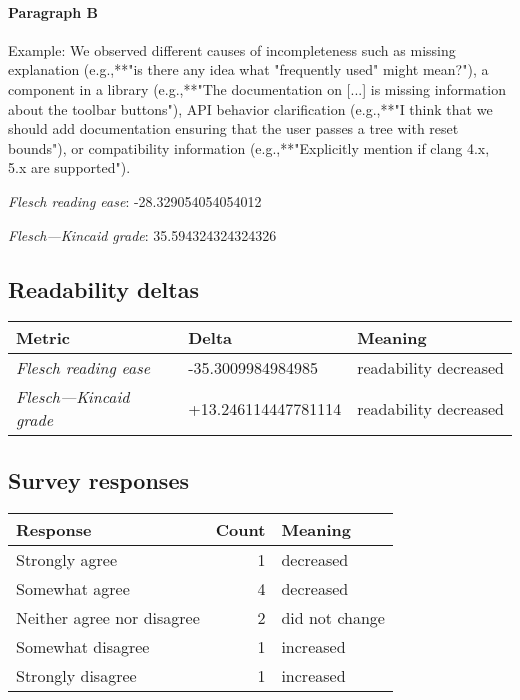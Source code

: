 \paragraph{Paragraph B}
Example: We observed different causes of incompleteness such as missing explanation (e.g.,**"is there any idea what "frequently used" might mean?"), a component in a library (e.g.,**"The documentation on [...] is missing information about the toolbar buttons"), API behavior clarification (e.g.,**"I think that we should add documentation ensuring that the user passes a tree with reset bounds"), or compatibility information (e.g.,**"Explicitly mention if clang 4.x, 5.x are supported").\par\medskip\emph{Flesch reading ease}: -28.329054054054012\par\emph{Flesch---Kincaid grade}: 35.594324324324326

\subsection{Readability deltas}

\begin{tabular}{lll}
\toprule
               \textbf{Metric} &       \textbf{Delta} &       \textbf{Meaning} \\
\midrule
    \emph{Flesch reading ease} &    -35.3009984984985 &  readability decreased \\
 \emph{Flesch---Kincaid grade} &  +13.246114447781114 &  readability decreased \\
\bottomrule
\end{tabular}

\subsection{Survey responses}
\begin{tabular}{lrl}
\toprule
          \textbf{Response} &  \textbf{Count} & \textbf{Meaning} \\
\midrule
             Strongly agree &               1 &        decreased \\
             Somewhat agree &               4 &        decreased \\
 Neither agree nor disagree &               2 &   did not change \\
          Somewhat disagree &               1 &        increased \\
          Strongly disagree &               1 &        increased \\
\bottomrule
\end{tabular}

